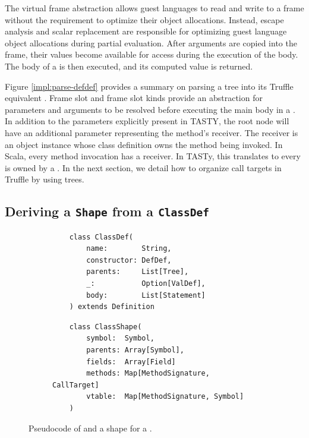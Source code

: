 The virtual frame abstraction allows guest languages to read and write to a frame without the requirement to optimize their object allocations.
Instead, escape analysis and scalar replacement are responsible for optimizing guest language object allocations during partial evaluation. 
After arguments are copied into the frame, their values become available for access during the execution of the body.
The body of a  is then executed, and its computed value is returned.

Figure \ref{impl:parse-defdef} provides a summary on parsing a  tree into its Truffle equivalent .
Frame slot and frame slot kinds provide an abstraction for parameters and arguments to be resolved before executing the main body in a .
In addition to the parameters explicitly present in TASTY, the root node will have an additional parameter representing the method's receiver.
The receiver is an object instance whose class definition owns the method being invoked.
In Scala, every method invocation has a receiver.
In TASTy, this translates to every  is owned by a .
In the next section, we detail how to organize call targets in Truffle by using  trees.

\subsection{Deriving a \texttt{Shape} from a \texttt{ClassDef}}

\begin{figure}[!htb]
	\centering
	\begin{subfigure}[b]{0.48\textwidth}
	\begin{verbatim}
	class ClassDef(
		name:        String,
		constructor: DefDef, 
		parents:     List[Tree], 
		_:           Option[ValDef], 
		body:        List[Statement]
	) extends Definition
		\end{verbatim}
	\label{recall:classdef}
	\end{subfigure}
	\hfill
	\begin{subfigure}[b]{0.48\textwidth}
	\begin{verbatim}
	class ClassShape(
		symbol:  Symbol,
		parents: Array[Symbol],
		fields:  Array[Field]
		methods: Map[MethodSignature, CallTarget]
		vtable:  Map[MethodSignature, Symbol]
	)
	\end{verbatim}
	\label{impl:classshape}
	\end{subfigure}
	\caption{Pseudocode of  and a shape for a .}
\end{figure}

